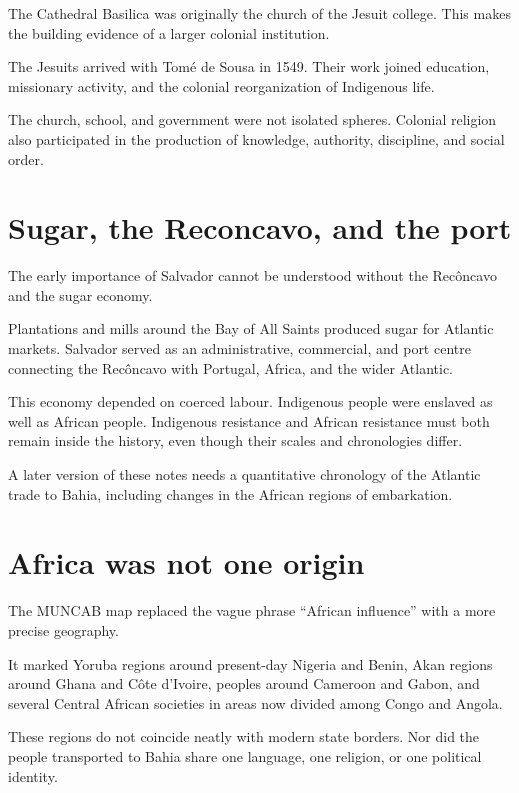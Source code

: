 The Cathedral Basilica was originally the
church of the Jesuit college.  This makes
the building evidence of a larger colonial
institution.

The Jesuits arrived with Tom\'e de Sousa in
1549.  Their work joined education,
missionary activity, and the colonial
reorganization of Indigenous life.

The church, school, and government were
not isolated spheres.  Colonial religion
also participated in the production of
knowledge, authority, discipline, and
social order.

\section{Sugar, the Reconcavo, and the port}
\label{section-sugar-reconcavo-port}

The early importance of Salvador cannot be
understood without the Rec\^oncavo and the
sugar economy.

Plantations and mills around the Bay of All
Saints produced sugar for Atlantic markets.
Salvador served as an administrative,
commercial, and port centre connecting the
Rec\^oncavo with Portugal, Africa, and the
wider Atlantic.

This economy depended on coerced labour.
Indigenous people were enslaved as well as
African people.  Indigenous resistance and
African resistance must both remain inside
the history, even though their scales and
chronologies differ.

A later version of these notes needs a
quantitative chronology of the Atlantic
trade to Bahia, including changes in the
African regions of embarkation.

\section{Africa was not one origin}
\label{section-africa-not-one-origin}

The MUNCAB map replaced the vague phrase
``African influence'' with a more precise
geography.

It marked Yoruba regions around present-day
Nigeria and Benin, Akan regions around
Ghana and C\^ote d'Ivoire, peoples around
Cameroon and Gabon, and several Central
African societies in areas now divided
among Congo and Angola.

These regions do not coincide neatly with
modern state borders.  Nor did the people
transported to Bahia share one language,
one religion, or one political identity.

